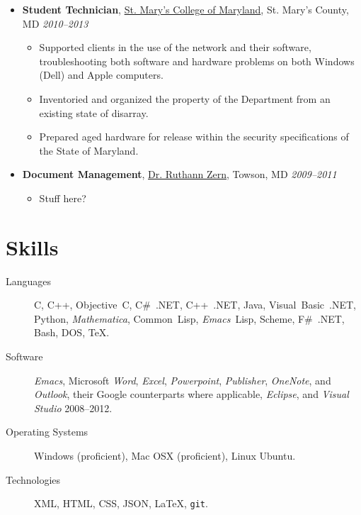 \documentclass[11pt,letterpaper]{article}
\makeatletter
\newcommand{\position}[5]{\item%
  \begin{tabular*}{1.0\linewidth}{l@{\extracolsep{\fill}}r}
    #1 & #2\\
    \textit{#3} & \textit{#4---#5}
  \end{tabular*}}
\renewcommand{\position}[6][]{%
\item[#1] \hspace*{-2em}\textbf{#4}, #2, #3\hfill
  \textit{#5--#6}\vspace*{-.8em}}
\newcommand{\software}[1]{\textsl{#1}}
\makeatother
\begin{document}
\begin{itemize}
\position {\href{http://oit.smcm.edu}
                {St. Mary's College of Maryland}}
          {St. Mary's County, MD}
          {Student Technician}
          {2010}{2013}
          \begin{itemize}
          \item Supported clients in the use of the network and their
            software, troubleshooting both software and hardware
            problems on both Windows (Dell) and Apple computers.
          \item Inventoried and organized the property of the
            Department from an existing state of disarray.
          \item Prepared aged hardware for release within the security
            specifications of the State of Maryland.
          \end{itemize}

\position {\href{http://www.cwcare.net/Provider.aspx?pid=1269}
                {Dr. Ruthann Zern}}
          {Towson, MD}
          {Document Management}
          {2009}{2011}

          \begin{itemize}
          \item Stuff here?
          \end{itemize}
\end{itemize}

\section*{Skills}
  \begin{description}
  \item[Languages] C, C++, Objective~C, C\#~.NET, C++~.NET, Java,
    Visual~Basic~.NET, Python, \software{Mathematica}, Common~Lisp,
    \software{Emacs}~Lisp, Scheme, F\#~.NET, Bash, DOS, \TeX.

  \item[Software] \software{Emacs}, Microsoft
    \software{Word}, \software{Excel}, \software{Powerpoint},
    \software{Publisher}, \software{OneNote}, and \software{Outlook},
    their Google counterparts where applicable, \software{Eclipse},
    and \software{Visual Studio} 2008--2012.

  \item[Operating Systems] Windows (proficient), Mac OSX (proficient),
    Linux Ubuntu.

  \item[Technologies] XML, HTML, CSS, JSON, \LaTeX{}, \texttt{git}.
  \end{description}
\end{document}
